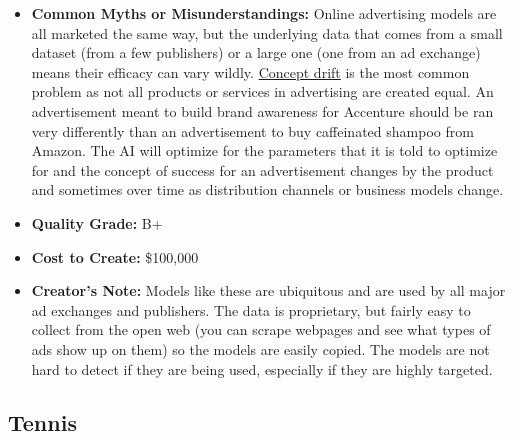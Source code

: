 \begin{itemize}
    \item \textbf{Common Myths or Misunderstandings:} Online advertising models are all marketed the same way, but the underlying data that comes from a small dataset (from a few publishers) or a large one (one from an ad exchange) means their efficacy can vary wildly. \hyperref[sec:drift]{Concept drift} is the most common problem as not all products or services in advertising are created equal. An advertisement meant to build brand awareness for Accenture should be ran very differently than an advertisement to buy caffeinated shampoo from Amazon. The AI will optimize for the parameters that it is told to optimize for and the concept of success for an advertisement changes by the product and sometimes over time as distribution channels or business models change.  
    \item \textbf{Quality Grade:} B+
    \item \textbf{Cost to Create:} \$100,000
    \item \textbf{Creator's Note:} Models like these are ubiquitous and are used by all major ad exchanges and publishers. The data is proprietary, but fairly easy to collect from the open web (you can scrape webpages and see what types of ads show up on them) so the models are easily copied. The models are not hard to detect if they are being used, especially if they are highly targeted.
\end{itemize}

\subsection{Tennis}

